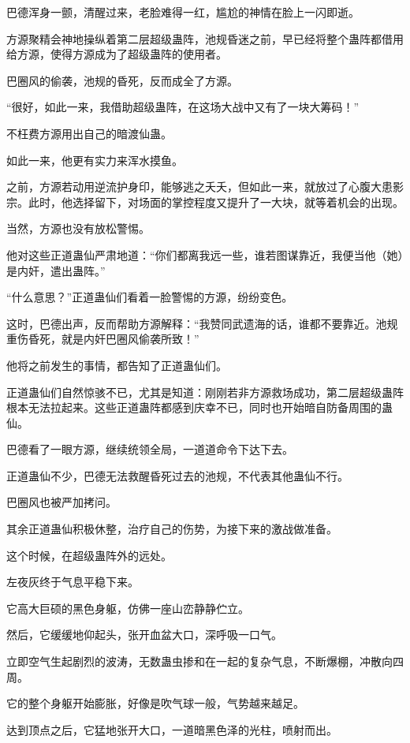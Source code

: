 
\begin{this_body}

巴德浑身一颤，清醒过来，老脸难得一红，尴尬的神情在脸上一闪即逝。

方源聚精会神地操纵着第二层超级蛊阵，池规昏迷之前，早已经将整个蛊阵都借用给方源，使得方源成为了超级蛊阵的使用者。

巴圈风的偷袭，池规的昏死，反而成全了方源。

“很好，如此一来，我借助超级蛊阵，在这场大战中又有了一块大筹码！”

不枉费方源用出自己的暗渡仙蛊。

如此一来，他更有实力来浑水摸鱼。

之前，方源若动用逆流护身印，能够逃之夭夭，但如此一来，就放过了心腹大患影宗。此时，他选择留下，对场面的掌控程度又提升了一大块，就等着机会的出现。

当然，方源也没有放松警惕。

他对这些正道蛊仙严肃地道：“你们都离我远一些，谁若图谋靠近，我便当他（她）是内奸，遣出蛊阵。”

“什么意思？”正道蛊仙们看着一脸警惕的方源，纷纷变色。

这时，巴德出声，反而帮助方源解释：“我赞同武遗海的话，谁都不要靠近。池规重伤昏死，就是内奸巴圈风偷袭所致！”

他将之前发生的事情，都告知了正道蛊仙们。

正道蛊仙们自然惊骇不已，尤其是知道：刚刚若非方源救场成功，第二层超级蛊阵根本无法拉起来。这些正道蛊阵都感到庆幸不已，同时也开始暗自防备周围的蛊仙。

巴德看了一眼方源，继续统领全局，一道道命令下达下去。

正道蛊仙不少，巴德无法救醒昏死过去的池规，不代表其他蛊仙不行。

巴圈风也被严加拷问。

其余正道蛊仙积极休整，治疗自己的伤势，为接下来的激战做准备。

这个时候，在超级蛊阵外的远处。

左夜灰终于气息平稳下来。

它高大巨硕的黑色身躯，仿佛一座山峦静静伫立。

然后，它缓缓地仰起头，张开血盆大口，深呼吸一口气。

立即空气生起剧烈的波涛，无数蛊虫掺和在一起的复杂气息，不断爆棚，冲散向四周。

它的整个身躯开始膨胀，好像是吹气球一般，气势越来越足。

达到顶点之后，它猛地张开大口，一道暗黑色泽的光柱，喷射而出。


\end{this_body}
